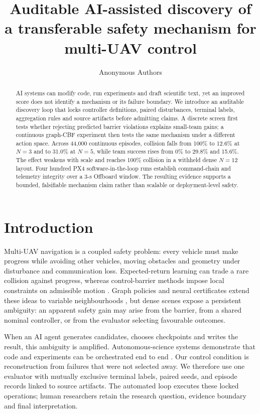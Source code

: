\documentclass{article}
\title{Auditable AI-assisted discovery of a transferable safety mechanism for multi-UAV control}
\author{Anonymous Authors}
\begin{document}
\maketitle

\begin{abstract}
AI systems can modify code, run experiments and draft scientific text, yet an improved score does not identify a mechanism or its failure boundary. We introduce an auditable discovery loop that locks controller definitions, paired disturbances, terminal labels, aggregation rules and source artifacts before admitting claims. A discrete screen first tests whether rejecting predicted barrier violations explains small-team gains; a continuous graph-CBF experiment then tests the same mechanism under a different action space. Across 44,000 continuous episodes, collision falls from 100\% to 12.6\% at $N=3$ and to 31.0\% at $N=5$, while team success rises from 0\% to 29.8\% and 15.6\%. The effect weakens with scale and reaches 100\% collision in a withheld dense $N=12$ layout. Four hundred PX4 software-in-the-loop runs establish command-chain and telemetry integrity over a 3-s Offboard window. The resulting evidence supports a bounded, falsifiable mechanism claim rather than scalable or deployment-level safety.
\end{abstract}

\section{Introduction}

Multi-UAV navigation is a coupled safety problem: every vehicle must make progress while avoiding other vehicles, moving obstacles and geometry under disturbance and communication loss. Expected-return learning can trade a rare collision against progress, whereas control-barrier methods impose local constraints on admissible motion \citep{ames2017cbf,garg2024safe}. Graph policies and neural certificates extend these ideas to variable neighbourhoods \citep{qin2021neural,zhang2025gcbfplus,zhang2025dgppo,nayak2023informarl}, but dense scenes expose a persistent ambiguity: an apparent safety gain may arise from the barrier, from a shared nominal controller, or from the evaluator selecting favourable outcomes.

When an AI agent generates candidates, chooses checkpoints and writes the result, this ambiguity is amplified. Autonomous-science systems demonstrate that code and experiments can be orchestrated end to end \citep{yang2024sweagent,lu2024aiscientist}. Our control condition is reconstruction from failures that were not selected away. We therefore use one evaluator with mutually exclusive terminal labels, paired seeds, and episode records linked to source artifacts. The automated loop executes these locked operations; human researchers retain the research question, evidence boundary and final interpretation.
\end{document}
